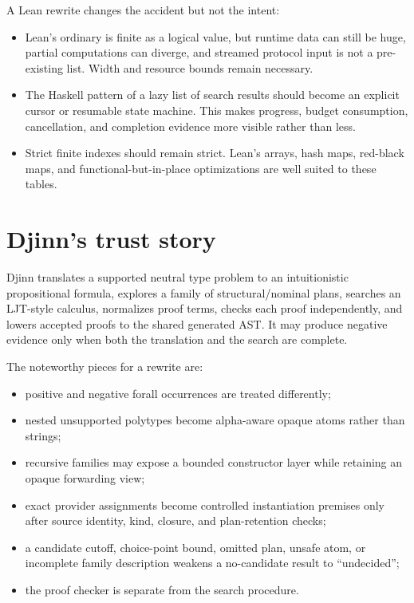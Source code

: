 \documentclass[10pt,letterpaper,oneside]{report}
\newcommand{\code}[1]{\texttt{\detokenize{#1}}}
\begin{document}
A Lean rewrite changes the accident but not the intent:

\begin{itemize}
  \item Lean's ordinary \code{List} is finite as a logical value, but runtime data can still be huge, partial computations can diverge, and streamed protocol input is not a pre-existing list. Width and resource bounds remain necessary.
  \item The Haskell pattern of a lazy list of search results should become an explicit cursor or resumable state machine. This makes progress, budget consumption, cancellation, and completion evidence more visible rather than less.
  \item Strict finite indexes should remain strict. Lean's arrays, hash maps, red-black maps, and functional-but-in-place optimizations are well suited to these tables.
\end{itemize}

\section{Djinn's trust story}

Djinn translates a supported neutral type problem to an intuitionistic propositional formula, explores a family of structural/nominal plans, searches an LJT-style calculus, normalizes proof terms, checks each proof independently, and lowers accepted proofs to the shared generated AST. It may produce negative evidence only when both the translation and the search are complete.

The noteworthy pieces for a rewrite are:

\begin{itemize}
  \item positive and negative forall occurrences are treated differently;
  \item nested unsupported polytypes become alpha-aware opaque atoms rather than strings;
  \item recursive families may expose a bounded constructor layer while retaining an opaque forwarding view;
  \item exact provider assignments become controlled instantiation premises only after source identity, kind, closure, and plan-retention checks;
  \item a candidate cutoff, choice-point bound, omitted plan, unsafe atom, or incomplete family description weakens a no-candidate result to ``undecided'';
  \item the proof checker is separate from the search procedure.
\end{itemize}
\end{document}
